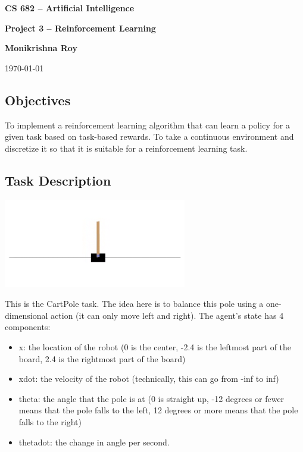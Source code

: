 \documentclass[twoside,10pt]{article}
\begin{document}
\begin{center}
    {\Large \bf CS 682 – Artificial Intelligence}

    \vspace{.5cm}

    {\Large \bf Project 3 – Reinforcement Learning}

    \vspace{0.5cm}
    {\large \bf Monikrishna Roy}
    \vspace{0.5cm}

    {\large \today}

\end{center}

\subsection*{Objectives}\label{objectives}

To implement a reinforcement learning algorithm that can learn a policy
for a given task based on task-based rewards. To take a continuous
environment and discretize it so that it is suitable for a reinforcement
learning task.


\subsection*{Task Description}\label{task-description}

\begin{center}
    \includegraphics[width=8cm]{figs/cartPole.png}
\end{center}

This is the CartPole task. The idea here is to balance this pole using a
one-dimensional action (it can only move left and right). The agent's
state has 4 components:

\begin{itemize}

    \item
          x: the location of the robot (0 is the center, -2.4 is the leftmost
          part of the board, 2.4 is the rightmost part of the board)
    \item
          xdot: the velocity of the robot (technically, this can go from -inf to
          inf)
    \item
          theta: the angle that the pole is at (0 is straight up, -12 degrees or
          fewer means that the pole falls to the left, 12 degrees or more means
          that the pole falls to the right)
    \item
          thetadot: the change in angle per second.
\end{itemize}
\end{document}
